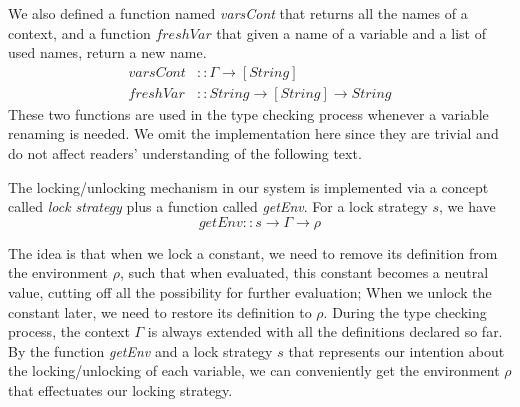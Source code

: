 \documentclass{article}
\theoremstyle{remark}
\begin{document}
We also defined a function named \emph{varsCont} that returns all the names of a context, and a function $freshVar$ that given a name of a variable and a list of used names, return a new name.
\begin{align*}
  varsCont &:: \Gamma \to [String] \\
  freshVar &:: String \to [String] \to String
\end{align*}
These two functions are used in the type checking process whenever a variable renaming is needed. We omit the implementation here since they are trivial and do not affect readers' understanding of the following text. 

The locking/unlocking mechanism in our system is implemented via a concept called \emph{lock strategy} plus a function called \emph{getEnv}. For a lock strategy $s$, we have 
\[ getEnv :: s \to \Gamma \to \rho \]

The idea is that when we lock a constant, we need to remove its definition from the environment $\rho$, such that when evaluated, this constant becomes a neutral value, cutting off all the possibility for further evaluation; When we unlock the constant later, we need to restore its definition to $\rho$. During the type checking process, the context $\Gamma$ is always extended with all the definitions declared so far. By the function \emph{getEnv} and a lock strategy $s$ that represents our intention about the locking/unlocking of each variable, we can conveniently get the environment $\rho$ that effectuates our locking strategy.
\end{document}
